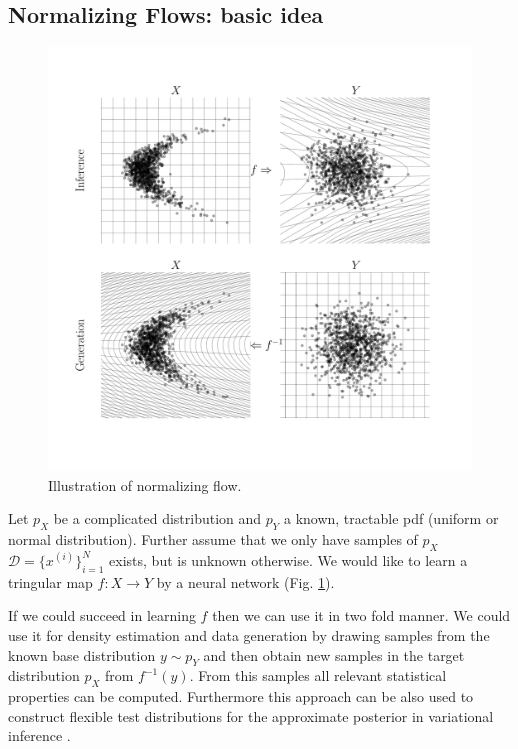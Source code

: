 \documentclass[12pt,a4paper]{article}
\begin{document}
\subsection{Normalizing Flows: basic idea}
\begin{figure}[h!]
	\includegraphics[width=\linewidth]{normalizing_flow_img.pdf}
	\caption{Illustration of normalizing flow.}
	\label{fig:normalizing_flow}
\end{figure}
Let $p_X$ be a complicated distribution and $p_Y$ a known, tractable pdf (uniform or normal distribution). Further assume that we only have samples of $p_X$ $\mathcal D = \{x^{(i)}\}_{i=1}^N$ exists, but is unknown otherwise. We would like to learn a tringular map $f: X\rightarrow Y$ by a neural network  (Fig. \ref{fig:normalizing_flow}).

If we could succeed in learning $f$ then we can use it in two fold manner. We could use it for density estimation and data generation by drawing samples from the known base distribution $y \sim p_Y$ and then obtain new samples in the target distribution $p_X$ from $f^{-1}(y)$. From this samples all relevant statistical properties can be computed.
 Furthermore this approach can be also used to construct flexible test distributions for the approximate posterior in variational inference \cite{rezende_2015}.
\end{document}
